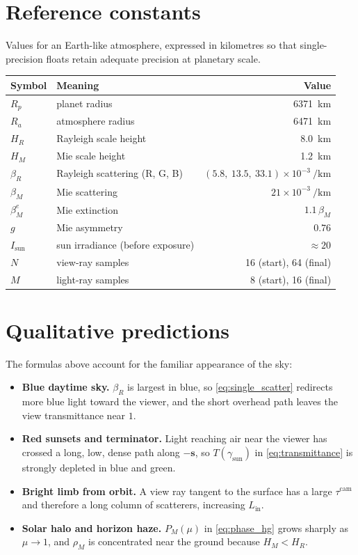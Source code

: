 \documentclass[11pt]{article}
\newcommand{\vect}[1]{\mathbf{#1}}
\newcommand{\Rp}{R_p}
\newcommand{\Ra}{R_a}
\begin{document}
\section{Reference constants}

Values for an Earth-like atmosphere, expressed in kilometres so that
single-precision floats retain adequate precision at planetary scale.

\begin{center}
\begin{tabular}{llr}
\toprule
Symbol & Meaning & Value \\
\midrule
$\Rp$ & planet radius & \SI{6371}{\kilo\metre} \\
$\Ra$ & atmosphere radius & \SI{6471}{\kilo\metre} \\
$H_R$ & Rayleigh scale height & \SI{8.0}{\kilo\metre} \\
$H_M$ & Mie scale height & \SI{1.2}{\kilo\metre} \\
$\beta_R$ & Rayleigh scattering (R, G, B) & $(5.8,\ 13.5,\ 33.1)\times 10^{-3}\ \si{\per\kilo\metre}$ \\
$\beta_M$ & Mie scattering & $21\times 10^{-3}\ \si{\per\kilo\metre}$ \\
$\beta_M^e$ & Mie extinction & $1.1\,\beta_M$ \\
$g$ & Mie asymmetry & $0.76$ \\
$I_{\mathrm{sun}}$ & sun irradiance (before exposure) & $\approx 20$ \\
$N$ & view-ray samples & 16 (start), 64 (final) \\
$M$ & light-ray samples & 8 (start), 16 (final) \\
\bottomrule
\end{tabular}
\end{center}

\section{Qualitative predictions}

The formulas above account for the familiar appearance of the sky:
\begin{itemize}
  \item \textbf{Blue daytime sky.} $\beta_R$ is largest in blue, so
        \eqref{eq:single_scatter} redirects more blue light toward the viewer,
        and the short overhead path leaves the view transmittance near $1$.
  \item \textbf{Red sunsets and terminator.} Light reaching air near the viewer
        has crossed a long, low, dense path along $-\vect{s}$, so
        $T(\gamma_{\mathrm{sun}})$ in \eqref{eq:transmittance} is strongly
        depleted in blue and green.
  \item \textbf{Bright limb from orbit.} A view ray tangent to the surface has a
        large $\tau^{\mathrm{cam}}$ and therefore a long column of scatterers,
        increasing $L_{\mathrm{in}}$.
  \item \textbf{Solar halo and horizon haze.} $P_M(\mu)$ in \eqref{eq:phase_hg}
        grows sharply as $\mu \to 1$, and $\rho_M$ is concentrated near the
        ground because $H_M < H_R$.
\end{itemize}
\end{document}

